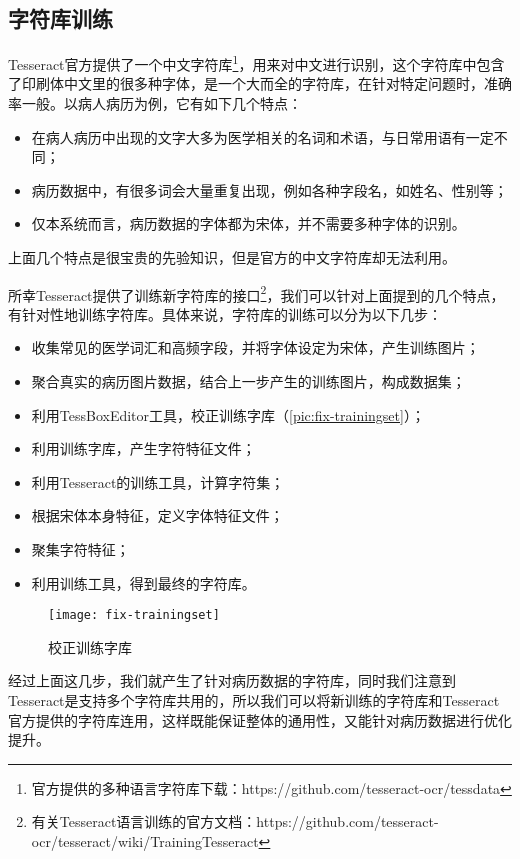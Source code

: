 \subsection{字符库训练}
Tesseract官方提供了一个中文字符库\footnote{官方提供的多种语言字符库下载：https://github.com/tesseract-ocr/tessdata}，用来对中文进行识别，这个字符库中包含了印刷体中文里的很多种字体，是一个大而全的字符库，在针对特定问题时，准确率一般。以病人病历为例，它有如下几个特点：
\begin{itemize}
	\item 在病人病历中出现的文字大多为医学相关的名词和术语，与日常用语有一定不同；
	\item 病历数据中，有很多词会大量重复出现，例如各种字段名，如姓名、性别等；
	\item 仅本系统而言，病历数据的字体都为宋体，并不需要多种字体的识别。
\end{itemize}
上面几个特点是很宝贵的先验知识，但是官方的中文字符库却无法利用。

所幸Tesseract提供了训练新字符库的接口\footnote{有关Tesseract语言训练的官方文档：https://github.com/tesseract-ocr/tesseract/wiki/TrainingTesseract}，我们可以针对上面提到的几个特点，有针对性地训练字符库。具体来说，字符库的训练可以分为以下几步：
\begin{itemize}
	\item 收集常见的医学词汇和高频字段，并将字体设定为宋体，产生训练图片；
	\item 聚合真实的病历图片数据，结合上一步产生的训练图片，构成数据集；
	\item 利用TessBoxEditor工具，校正训练字库（\autoref{pic:fix-trainingset}）；
	\item 利用训练字库，产生字符特征文件；
	\item 利用Tesseract的训练工具，计算字符集；
	\item 根据宋体本身特征，定义字体特征文件；
	\item 聚集字符特征；
	\item 利用训练工具，得到最终的字符库。
\end{itemize}

\begin{figure}[htbp]
	\centering
	\caption{校正训练字库}
	\texttt{[image: fix-trainingset]}
	\label{pic:fix-trainingset}
\end{figure}
经过上面这几步，我们就产生了针对病历数据的字符库，同时我们注意到Tesseract是支持多个字符库共用的，所以我们可以将新训练的字符库和Tesseract官方提供的字符库连用，这样既能保证整体的通用性，又能针对病历数据进行优化提升。

